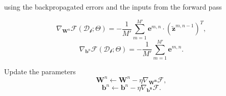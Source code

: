 \begin{algorithm}[th!]
\begin{algorithmic}[1]
		\ENDFOR	
        \ENDIF

		\vspace{0.3cm}
         using the backpropagated errors and the inputs from the forward pass

        $$\nabla_{\mathbf{W}^n}\mathcal{F}(\mathcal{D_b};\Theta)  = -\frac{1}{M'} \sum_{m=1}^{M'} \mathbf{e}^{m,n} \cdot \left(\tilde{\mathbf{z}}^{m,n-1}\right)^T,$$
        $$\nabla_{\mathbf{b}^n}\mathcal{F}(\mathcal{D_b};\Theta)  = - \frac{1}{M'} \sum_{m=1}^{M'} \mathbf{e}^{m,n}.$$

		\vspace{0.3cm}
        \STATE Update the parameters
            $$\mathbf{W}^n \leftarrow \mathbf{W}^n - \eta \nabla_\mathbf{W^n}\mathcal{F},$$
            $$\mathbf{b}^n \leftarrow \mathbf{b}^n - \eta \nabla_\mathbf{b^n}\mathcal{F}.$$

	\ENDFOR

	\ENDFOR
	\ENDFOR
\end{algorithmic}
\end{algorithm}

\clearpage

